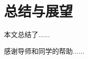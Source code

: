 \documentclass{jluthesis}
\begin{document}
	\section{总结与展望}
	
	本文总结了......
	
	
    \makebibliography
	
    \begin{acknowledgment}
	    感谢导师和同学的帮助......
    \end{acknowledgment}
	
\end{document}
